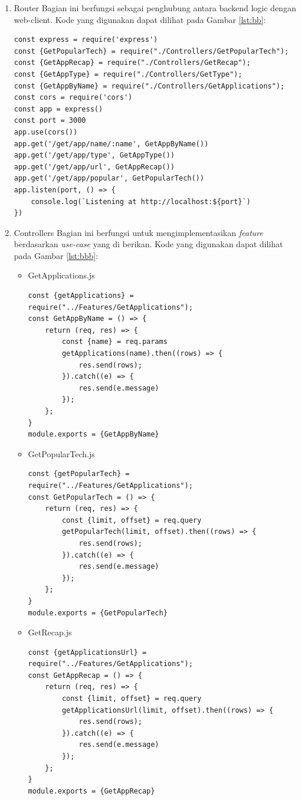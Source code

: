 \begin{enumerate}
	\item Router
	Bagian ini berfungsi sebagai penghubung antara backend logic dengan web-client. Kode yang digunakan dapat dilihat pada Gambar \ref{lst:bb}:
	\begin{lstlisting}[label={lst:bb}, caption={Penghubung Backend Logic dengan Web-Client}]
const express = require('express')
const {GetPopularTech} = require("./Controllers/GetPopularTech");
const {GetAppRecap} = require("./Controllers/GetRecap");
const {GetAppType} = require("./Controllers/GetType");
const {GetAppByName} = require("./Controllers/GetApplications");
const cors = require('cors')
const app = express()
const port = 3000
app.use(cors())
app.get('/get/app/name/:name', GetAppByName())
app.get('/get/app/type', GetAppType())
app.get('/get/app/url', GetAppRecap())
app.get('/get/app/popular', GetPopularTech())
app.listen(port, () => {
	console.log(`Listening at http://localhost:${port}`)
})
	\end{lstlisting}
	
	
	\item Controllers
	Bagian ini berfungsi untuk mengimplementasikan \textit{feature} berdasarkan \textit{use-case} yang di berikan.
	Kode yang digunakan dapat dilihat pada Gambar \ref{lst:bbb}:
	\begin{itemize}
		\item GetApplications.js
		\begin{lstlisting}[label={lst:bbb}, caption={Mendapatkan Aplikasi dan Hasilnya}]
const {getApplications} = require("../Features/GetApplications");
const GetAppByName = () => {
	return (req, res) => {
		const {name} = req.params
		getApplications(name).then((rows) => {
			res.send(rows);
		}).catch((e) => {
			res.send(e.message)
		});
	};
}
module.exports = {GetAppByName}
\end{lstlisting}

\item GetPopularTech.js
\begin{lstlisting}[label={lst:bbbb}, caption={Mendapatkan Aplikasi yang Populer}]
const {getPopularTech} = require("../Features/GetApplications");
const GetPopularTech = () => {
	return (req, res) => {
		const {limit, offset} = req.query
		getPopularTech(limit, offset).then((rows) => {
			res.send(rows);
		}).catch((e) => {
			res.send(e.message)
		});
	};
}
module.exports = {GetPopularTech}
\end{lstlisting}

\item GetRecap.js
\begin{lstlisting}[label={lst:bbbbb}, caption={Mendapatkan URL dengan Jumlah Jumlah Result dari Aplikasi}]
const {getApplicationsUrl} = require("../Features/GetApplications");
const GetAppRecap = () => {
	return (req, res) => {
		const {limit, offset} = req.query
		getApplicationsUrl(limit, offset).then((rows) => {
			res.send(rows);
		}).catch((e) => {
			res.send(e.message)
		});
	};
}
module.exports = {GetAppRecap}
\end{lstlisting}


\end{itemize}
\end{enumerate}
